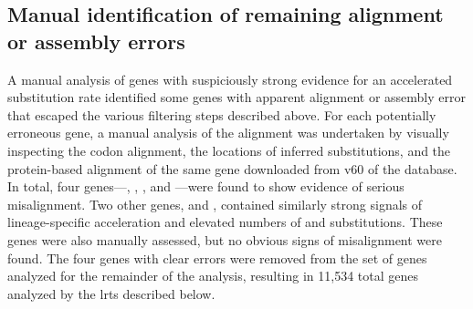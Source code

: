 \subsection{Manual identification of remaining alignment or assembly errors}

A manual analysis of genes with suspiciously strong evidence for an
accelerated \nsyn substitution rate identified some genes with
apparent alignment or assembly error that escaped the various
filtering steps described above. For each potentially erroneous gene,
a manual analysis of the alignment was undertaken by visually
inspecting the codon alignment, the locations of inferred
substitutions, and the protein-based alignment of the same gene
downloaded from v60 of the \ens \cmp database. In total, four
genes---, , , and
---were found to show evidence of serious misalignment. Two
other genes,  and , contained similarly
strong signals of lineage-specific acceleration and elevated numbers
of \nsyn and \syn substitutions. These genes were also manually
assessed, but no obvious signs of misalignment were found. The four
genes with clear errors were removed from the set of genes analyzed
for the remainder of the analysis, resulting in 11,534 total genes
analyzed by the \acp{lrt} described below.




